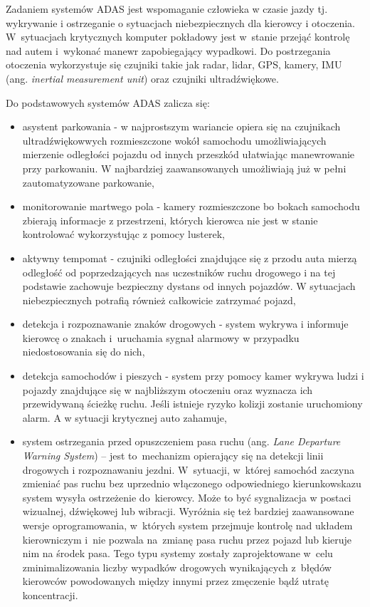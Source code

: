 Zadaniem systemów ADAS jest wspomaganie człowieka w czasie jazdy tj. wykrywanie i ostrzeganie o sytuacjach niebezpiecznych dla kierowcy i otoczenia. 
W~sytuacjach krytycznych komputer pokładowy jest w~stanie przejąć kontrolę nad autem i~wykonać manewr zapobiegający wypadkowi. 
Do postrzegania otoczenia wykorzystuje się czujniki takie jak radar, lidar, GPS, kamery, IMU (ang. \textit{inertial measurement unit}) oraz czujniki ultradźwiękowe.



Do podstawowych systemów ADAS zalicza się:
\begin{itemize}
	\item asystent parkowania - w najprostszym wariancie opiera się na czujnikach ultradźwiękowwych rozmieszczone wokół samochodu umożliwiających mierzenie odległości pojazdu od innych przeszkód ułatwiając manewrowanie przy parkowaniu. W najbardziej zaawansowanych umożliwiają już w pełni zautomatyzowane parkowanie,
	\item monitorowanie martwego pola - kamery rozmieszczone bo bokach samochodu zbierają informacje z przestrzeni, których kierowca nie jest w stanie kontrolować wykorzystując z pomocy lusterek,
	\item aktywny tempomat - czujniki odległości znajdujące się z przodu auta mierzą odległość od poprzedzających nas uczestników ruchu drogowego i na tej podstawie zachowuje bezpieczny dystans od innych pojazdów. W sytuacjach niebezpiecznych potrafią również całkowicie zatrzymać pojazd,

	\item detekcja i rozpoznawanie znaków drogowych - system wykrywa i informuje kierowcę o znakach i~uruchamia sygnał alarmowy w przypadku niedostosowania się do nich,
	\item detekcja samochodów i pieszych - system przy pomocy kamer wykrywa ludzi i pojazdy znajdujące się w najbliższym otoczeniu oraz wyznacza ich przewidywaną ścieżkę ruchu. Jeśli istnieje ryzyko kolizji zostanie uruchomiony alarm. A w sytuacji krytycznej auto zahamuje,
	\item system ostrzegania przed opuszczeniem pasa ruchu (ang. \textit{Lane Departure Warning System}) -- jest to~mechanizm opierający się na detekcji linii drogowych i rozpoznawaniu jezdni. W~sytuacji, w~której samochód zaczyna zmieniać pas ruchu bez uprzednio włączonego odpowiedniego kierunkowskazu system wysyła ostrzeżenie do~kierowcy. Może to być sygnalizacja w postaci wizualnej, dźwiękowej lub wibracji. Wyróżnia się też bardziej zaawansowane wersje oprogramowania, w~których system przejmuje kontrolę nad układem kierowniczym i~nie pozwala na~zmianę pasa ruchu przez pojazd lub kieruje nim na środek pasa. Tego typu systemy zostały zaprojektowane w~celu zminimalizowania liczby wypadków drogowych wynikających z~błędów kierowców powodowanych między innymi przez zmęczenie bądź utratę koncentracji.
\end{itemize}


